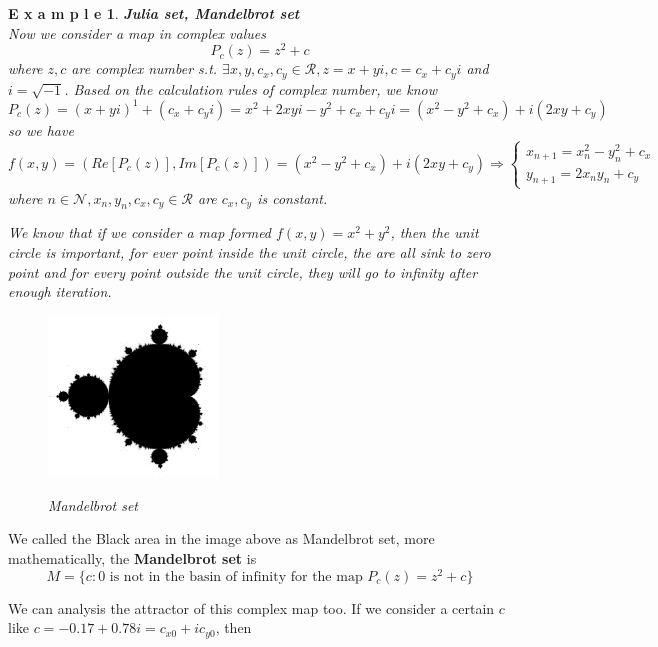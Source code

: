 \documentclass[12pt]{article}
\theoremstyle{plain}
\newtheorem{example}{\textbf{E x a m p l e}}[section]
\begin{document}
\begin{example}\textbf{Julia set, Mandelbrot set}
\\\noindent Now we consider a map in complex values
$$
P_c(z) = z^2 + c
$$
where $z, c$ are complex number s.t. $\exists x, y, c_x, c_y \in \mathcal R, z = x + yi, c = c_x + c_yi$ and $i = \sqrt{-1}$. Based on the calculation rules of complex number, we know 
$$
P_c(z) = (x+yi)^1 + (c_x + c_yi) = x^2 + 2xyi - y^2 + c_x + c_yi = (x^2 - y^2 + c_x) + i(2xy + c_y)
$$
so we have 
$$
f(x, y) = (Re[P_c(z)], Im[P_c(z)]) = (x^2 - y^2 + c_x) + i(2xy + c_y) 
\Rightarrow \left\{
\begin{array}{l}
x_{n+1} = x_n^2 - y_n^2 + c_x \\
y_{n+1} = 2x_ny_n + c_y
\end{array}\right.
$$
where $n \in \mathcal N, x_n, y_n, c_x, c_y \in \mathcal R$ are $c_x, c_y$ is constant.

We know that if we consider a map formed $f(x,y) = x^2 + y^2$, then the unit circle is important, for ever point inside the unit circle, the are all sink to zero point and for every point outside the unit circle, they will go to infinity after enough iteration. 

\begin{figure}[H]
\begin{center}
\includegraphics[width=0.4\textwidth]{figure/section4/mandelbrot.png} \\
\caption{Mandelbrot set}\label{mandelbrot-set}
\end{center}
\end{figure}
\end{example}

We called the Black area in the image above as Mandelbrot set, more mathematically, the \textbf{Mandelbrot set} is
$$
M = \{c: 0 \text{ is not in the basin of infinity for the map } P_c(z) = z^2 + c\}
$$

We can analysis the attractor of this complex map too. If we consider a certain $c$ like $ c = -0.17+0.78i = c_{x0} + ic_{y0}$, then 
\end{document}
